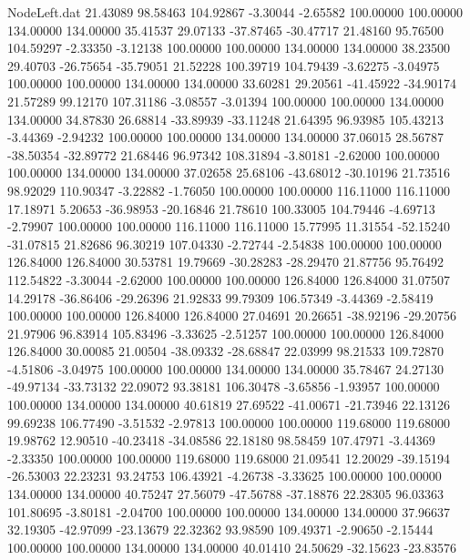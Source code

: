 \begin{filecontents}{NodeLeft.dat}
  21.43089   98.58463  104.92867    -3.30044   -2.65582  100.00000  100.00000  134.00000  134.00000   35.41537   29.07133  -37.87465  -30.47717
  21.48160   95.76500  104.59297    -2.33350   -3.12138  100.00000  100.00000  134.00000  134.00000   38.23500   29.40703  -26.75654  -35.79051
  21.52228  100.39719  104.79439    -3.62275   -3.04975  100.00000  100.00000  134.00000  134.00000   33.60281   29.20561  -41.45922  -34.90174
  21.57289   99.12170  107.31186    -3.08557   -3.01394  100.00000  100.00000  134.00000  134.00000   34.87830   26.68814  -33.89939  -33.11248
  21.64395   96.93985  105.43213    -3.44369   -2.94232  100.00000  100.00000  134.00000  134.00000   37.06015   28.56787  -38.50354  -32.89772
  21.68446   96.97342  108.31894    -3.80181   -2.62000  100.00000  100.00000  134.00000  134.00000   37.02658   25.68106  -43.68012  -30.10196
  21.73516   98.92029  110.90347    -3.22882   -1.76050  100.00000  100.00000  116.11000  116.11000   17.18971    5.20653  -36.98953  -20.16846
  21.78610  100.33005  104.79446    -4.69713   -2.79907  100.00000  100.00000  116.11000  116.11000   15.77995   11.31554  -52.15240  -31.07815
  21.82686   96.30219  107.04330    -2.72744   -2.54838  100.00000  100.00000  126.84000  126.84000   30.53781   19.79669  -30.28283  -28.29470
  21.87756   95.76492  112.54822    -3.30044   -2.62000  100.00000  100.00000  126.84000  126.84000   31.07507   14.29178  -36.86406  -29.26396
  21.92833   99.79309  106.57349    -3.44369   -2.58419  100.00000  100.00000  126.84000  126.84000   27.04691   20.26651  -38.92196  -29.20756
  21.97906   96.83914  105.83496    -3.33625   -2.51257  100.00000  100.00000  126.84000  126.84000   30.00085   21.00504  -38.09332  -28.68847
  22.03999   98.21533  109.72870    -4.51806   -3.04975  100.00000  100.00000  134.00000  134.00000   35.78467   24.27130  -49.97134  -33.73132
  22.09072   93.38181  106.30478    -3.65856   -1.93957  100.00000  100.00000  134.00000  134.00000   40.61819   27.69522  -41.00671  -21.73946
  22.13126   99.69238  106.77490    -3.51532   -2.97813  100.00000  100.00000  119.68000  119.68000   19.98762   12.90510  -40.23418  -34.08586
  22.18180   98.58459  107.47971    -3.44369   -2.33350  100.00000  100.00000  119.68000  119.68000   21.09541   12.20029  -39.15194  -26.53003
  22.23231   93.24753  106.43921    -4.26738   -3.33625  100.00000  100.00000  134.00000  134.00000   40.75247   27.56079  -47.56788  -37.18876
  22.28305   96.03363  101.80695    -3.80181   -2.04700  100.00000  100.00000  134.00000  134.00000   37.96637   32.19305  -42.97099  -23.13679
  22.32362   93.98590  109.49371    -2.90650   -2.15444  100.00000  100.00000  134.00000  134.00000   40.01410   24.50629  -32.15623  -23.83576

\end{filecontents}
